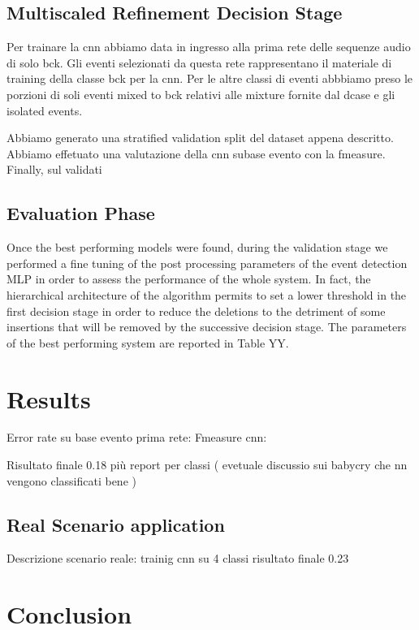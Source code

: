 \documentclass{article}
\begin{document}
\begin{sloppy}
\subsection{Multiscaled Refinement Decision Stage}
Per trainare la cnn abbiamo data in ingresso alla prima rete delle sequenze audio di solo bck. Gli eventi selezionati da questa rete rappresentano il materiale di training
della classe bck per la cnn. Per le altre classi di eventi abbbiamo preso le porzioni di soli eventi mixed to bck relativi alle mixture fornite dal dcase e gli isolated events.

Abbiamo generato una stratified validation split del dataset appena descritto. 
Abbiamo effetuato una valutazione della cnn subase evento con la fmeasure.
Finally, sul validati

\subsection{Evaluation Phase}
Once the best performing models were found, during the validation stage we performed a fine tuning of the post processing parameters of the event detection MLP in order to assess the performance of the whole system. In fact, the hierarchical architecture of the algorithm permits to set a lower threshold in the first decision stage in order to reduce the deletions to the detriment of some insertions that will be removed by the successive decision stage. The parameters of the best performing system are reported in Table YY.
\section{Results}
Error rate su base evento prima rete: 
Fmeasure cnn:

Risultato finale 0.18 più report per classi ( evetuale discussio sui babycry che nn vengono classificati bene )
\label{sec:typestyle}

\subsection{Real Scenario application}
Descrizione scenario reale: trainig cnn su 4 classi
risultato finale 0.23

\section{Conclusion}
\label{sec:majhead}



\end{sloppy}
\end{document}
